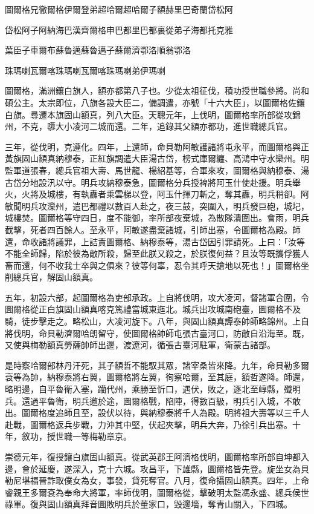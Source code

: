 
\begin{pinyinscope}
圖爾格兄徹爾格伊爾登弟超哈爾超哈爾子額赫里巴奇蘭岱松阿

岱松阿子阿納海巴漢齊爾格申巴都里巴都裏從弟子海都托克雅

葉臣子車爾布蘇魯邁蘇魯邁子蘇爾濟鄂洛順翁鄂洛

珠瑪喇瓦爾喀珠瑪喇瓦爾喀珠瑪喇弟伊瑪喇

圖爾格，滿洲鑲白旗人，額亦都第八子也。少從太祖征伐，積功授世職參將。尚和碩公主。太宗即位，八旗各設大臣二，備調遣，亦號「十六大臣」，以圖爾格佐鑲白旗。尋遷本旗固山額真，列八大臣。天聰元年，上伐明，圖爾格率所部從攻錦州，不克，隳大小凌河二城而還。二年，追錄其父額亦都功，進世職總兵官。

三年，從伐明，克遵化。四年，上還師，命貝勒阿敏護諸將屯永平，而圖爾格與正黃旗固山額真納穆泰，正紅旗調遣大臣湯古岱，榜式庫爾纏、高鴻中守水欒州。明監軍道張春，總兵官祖大壽、馬世龍、楊紹基等，合軍來攻，圖爾格與納穆泰、湯古岱分地設汛以守。明兵攻納穆泰急，圖爾格分兵授裨將阿玉什使赴援。明兵舉火，火將及城樓，有執纛者乘雲梯以登，阿玉什揮刀斬之，奪其纛，明兵稍卻。阿敏聞明兵攻灤州，遣巴都禮以數百人赴之，夜三鼓，突圍入，明兵發巨砲，城圮，城樓焚。圖爾格等守四日，度不能御，率所部夜棄城，為散隊潰圍出。會雨，明兵截擊，死者四百餘人。至永平，阿敏遂盡棄諸城，引師出塞，令圖爾格為殿。師還，命收諸將議罪，上詰責圖爾格、納穆泰等，湯古岱因引罪請死。上曰：「汝等不能全師歸，陷於彼為敵所殺，歸至此朕又殺之，於朕復何益？且汝等既攜俘獲人畜而還，何不收我士卒與之俱來？彼等何辜，忍令其呼天搶地以死也！」圖爾格坐削總兵官，解固山額真。

五年，初設六部，起圖爾格為吏部承政。上自將伐明，攻大凌河，督諸軍合圍，令圖爾格從正白旗固山額真喀克篤禮當城東迤北。城兵出攻城南砲臺，圖爾格不及騎，徒步擊走之。略松山，大凌河旋下。八年，與固山額真譚泰帥師略錦州。上自將伐明，命貝勒濟爾哈朗留守，使圖爾格帥師屯張古臺河口，防敵自沿海至。既，又使與梅勒額真勞薩帥師出邊，渡遼河，循張古臺河駐軍，衛蒙古諸部。

是時察哈爾部林丹汗死，其子額哲不能馭其眾，諸宰桑皆來降。九年，命貝勒多爾袞等為帥，納穆泰將右翼，圖爾格將左翼，徇察哈爾，至其庭，額哲遂降。師還，略明邊，自平魯衛入塞，躪代州，乘勝至忻口，遇伏，敗之，逐北至崞縣，殲明兵。還過平魯衛，明兵邀於途，圖爾格戰，陷陣，得數百級，明兵引入城，不敢出。圖爾格度追師且至，設伏以待，與納穆泰將千人為殿。明將祖大壽等以三千人赴戰，圖爾格返兵步戰，力沖其中堅，伏起夾擊，明兵大奔，乃徐引兵出塞。十年，敘功，授世職一等梅勒章京。

崇德元年，復授鑲白旗固山額真。從武英郡王阿濟格伐明，圖爾格率所部自坤都入邊，會於延慶，遂深入，克十六城。攻昌平，下雄縣，圖爾格皆先登。旋坐女為貝勒尼堪福晉詐取僕女為女，事發，貸死奪官。八月，復命攝固山額真。四年，上命睿親王多爾袞為奉命大將軍，率師伐明，圖爾格從，擊破明太監馮永盛、總兵侯世祿軍。復與固山額真拜音圖敗明兵於董家口，毀邊墻，奪青山關入，下四城。


\end{pinyinscope}
